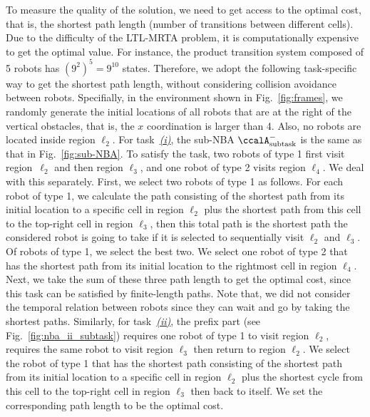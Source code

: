 \documentclass[Afour,sageh,times]{sagej}
\newcommand{\auto}[1]{\ccalA_{\textup{#1}}}
\begin{document}
{To measure the quality of the solution, we need to get access to the optimal cost, that is, the shortest path length (number of transitions between different cells). Due to the difficulty of the LTL-MRTA problem, it is computationally expensive to get the optimal value. For instance, the product transition system composed of 5 robots has $(9^2)^5=9^{10}$ states. Therefore, we adopt the following task-specific way to get the shortest path length, without considering collision avoidance between robots. Specifially, in the environment shown in Fig.~\ref{fig:frames},  we randomly generate the initial locations
of all robots that are at the right of the vertical obstacles, that is, the $x$ coordination is larger than 4. Also, no robots are located inside region $\ell_2$. For task~\hyperref[task:i]{\it (i)}, the sub-NBA $\auto{subtask}^-$ is the same as that in Fig.~\ref{fig:sub-NBA}. To satisfy the task, two robots of type 1 first visit region~$\ell_2$ and then region $\ell_3$, and one robot of type 2 visits region $\ell_4$. We deal with this separately. First, we select two robots of type 1 as follows. For each robot of type 1, we calculate the path consisting of the shortest path from its initial location to a specific cell in region $\ell_2$ plus the shortest path from this cell to the  top-right cell in region $\ell_3$, then this total path is the shortest path the considered robot is going to  take if it is selected to sequentially visit $\ell_2$ and $\ell_3$. Of robots of type 1, we select the best two. We select one robot of type 2 that has the shortest path from its initial location to the  rightmost cell in region $\ell_4$. Next, we take the sum of these three path length to get the optimal cost, since this task can be satisfied by finite-length paths. Note that, we did not consider the temporal relation between robots since they can wait and go by taking the shortest paths. Similarly, for task~\hyperref[task:ii]{\it (ii)}, the prefix part (see Fig.~\ref{fig:nba_ii_subtask}) requires one robot of type 1 to visit region $\ell_2$,  requires the same robot to visit region $\ell_3$ then return to region $\ell_2$. We select the robot of type 1 that has the shortest path consisting of the shortest path from its initial location to a specific cell in region $\ell_2$ plus the shortest cycle from this cell to the top-right cell in region $\ell_3$ then back to itself. We set the corresponding path length to  be the optimal cost.

}
\end{document}
